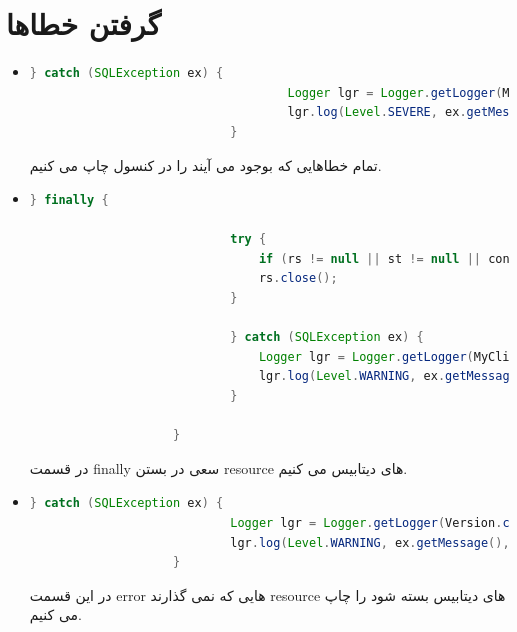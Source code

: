 \documentclass[a4paper]{article}
\begin{document}
			 \section{گرفتن خطاها}
			\begin{itemize}
				\item{}
				\begin{latin}
					\begin{lstlisting}[language=Java]
							} catch (SQLException ex) {
									Logger lgr = Logger.getLogger(MyClient.class.getName());
									lgr.log(Level.SEVERE, ex.getMessage(), ex);
							} 
					\end{lstlisting}
				\end{latin}
				تمام خطاهایی که بوجود می آیند را در کنسول چاپ می کنیم.
			
			\item{}
			\begin{latin}
				\begin{lstlisting}[language=Java]
					} finally {
					
							try {
								if (rs != null || st != null || con != null) {
								rs.close();
							}
							
							} catch (SQLException ex) {
								Logger lgr = Logger.getLogger(MyClient.class.getName());
								lgr.log(Level.WARNING, ex.getMessage(), ex);
							}
					
					}
				\end{lstlisting}
			\end{latin}
			در قسمت 
			finally
			سعی در بستن
			resource 
			های دیتابیس می کنیم.
			
			\item{}
			\begin{latin}
				\begin{lstlisting}[language=Java]
					} catch (SQLException ex) {
							Logger lgr = Logger.getLogger(Version.class.getName());
							lgr.log(Level.WARNING, ex.getMessage(), ex);
					} 
				\end{lstlisting}
			\end{latin}
			در این قسمت 
			error
			هایی که نمی گذارند
			resource
			 های دیتابیس بسته شود را چاپ می کنیم.
			
			
			\end{itemize}
			
			
			
\end{document}
